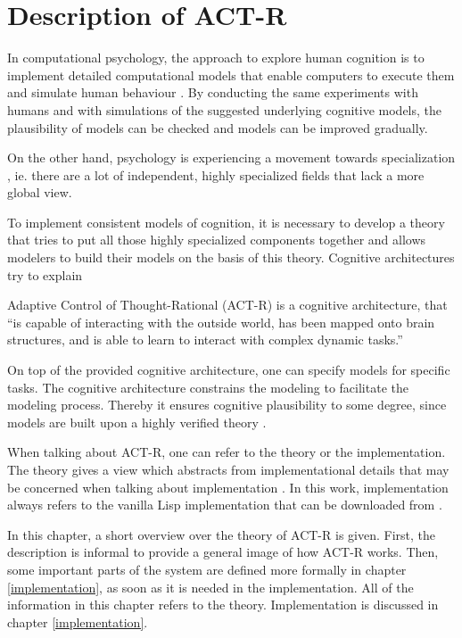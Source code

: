 \chapter{Description of ACT-R}
\label{actr_description}

In computational psychology, the approach to explore human cognition is to implement detailed computational models that enable computers to execute them and simulate human behaviour \cite{sun_introduction_2008}. By conducting the same experiments with humans and with simulations of the suggested underlying cognitive models, the plausibility of models can be checked and models can be improved gradually.

On the other hand, psychology is experiencing a movement towards specialization \cite{anderson_integrated_2004}, ie. there are a lot of independent, highly specialized fields that lack a more global view.

To implement consistent models of cognition, it is necessary to develop a theory that tries to put all those highly specialized components together and allows modelers to build their models on the basis of this theory. Cognitive architectures try to explain 


Adaptive Control of Thought-Rational  (ACT-R) is a cognitive architecture, that ``is capable of interacting with the outside world, has been mapped onto brain structures, and is able to learn to interact with complex dynamic tasks.'' \cite[29]{taatgen_modeling_2006} 

On top of the provided cognitive architecture, one can specify models for specific tasks. The cognitive architecture constrains the modeling to facilitate the modeling process. Thereby it ensures cognitive plausibility to some degree, since models are built upon a highly verified theory \cite[p. 29]{taatgen_modeling_2006}.

When talking about ACT-R, one can refer to the theory or the implementation. The theory gives a view which abstracts from implementational details that may be concerned when talking about implementation . In this work, implementation always refers to the vanilla Lisp implementation that can be downloaded from \cite{actr_homepage}.

In this chapter, a short overview over the theory of ACT-R is given. First, the description is informal to provide a general image of how ACT-R works. Then, some important parts of the system are defined more formally in chapter \ref{implementation}, as soon as it is needed in the implementation. All of the information in this chapter refers to the theory. Implementation is discussed in chapter \ref{implementation}.

